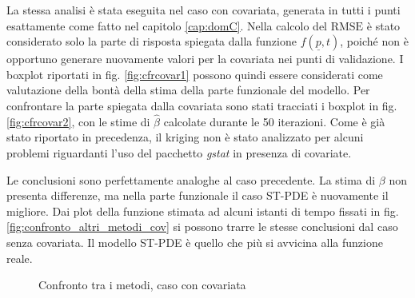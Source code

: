 \documentclass[a4paper,11pt,twoside,openright]{book}							%
\begin{document}
La stessa analisi è stata eseguita nel caso con covariata, generata in tutti i punti esattamente come fatto nel capitolo \ref{cap:domC}. Nella calcolo del $\mathrm{RMSE}$ è stato considerato solo la parte di risposta spiegata dalla funzione $f(\underline p,t)$, poiché non è opportuno generare nuovamente valori per la covariata nei punti di validazione. I boxplot riportati in fig. \ref{fig:cfrcovar1} possono quindi essere considerati come valutazione della bontà della stima della parte funzionale del modello. Per confrontare la parte spiegata dalla covariata sono stati tracciati i boxplot in fig. \ref{fig:cfrcovar2}, con le stime di $\hat{\beta}$ calcolate durante le 50 iterazioni. Come è già stato riportato in precedenza, il kriging non è stato analizzato per alcuni problemi riguardanti l'uso del pacchetto \textit{gstat} in presenza di covariate.

Le conclusioni sono perfettamente analoghe al caso precedente. La stima di $\beta$ non presenta differenze, ma nella parte funzionale il caso ST-PDE è nuovamente il migliore. Dai plot della funzione stimata ad alcuni istanti di tempo fissati in fig. \ref{fig:confronto_altri_metodi_cov} si possono trarre le stesse conclusioni dal caso senza covariata. Il modello ST-PDE è quello che più si avvicina alla funzione reale.

\begin{figure}[t]
	\centering
	\caption{Confronto tra i metodi, caso con covariata}
	\label{fig:cfrcovar}
\end{figure}
\end{document}
